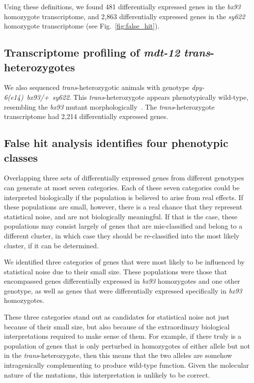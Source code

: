 \documentclass[10pt, twocolumn]{article}
\newcommand{\gene}[1]{\mbox{\emph{#1}}}
\newcommand{\strongn}{2,863}
\newcommand{\weakn}{481}
\newcommand{\transn}{2,214}
\begin{document}
Using these definitions, we found \weakn{} differentially expressed
genes in the  \emph{bx93} homozygote transcriptome, and \strongn{}
differentially expressed genes in the \emph{sy622} homozygote transcriptome
(see Fig.~\ref{fig:false_hit}).

\subsection*{Transcriptome profiling of \gene{mdt-12}
             \emph{trans}-heterozygotes}
We also sequenced \emph{trans}-heterozygotic animals with genotype
\gene{dpy-6(e14) bx93/+ sy622}. This \emph{trans}-heterozygote appears
phenotypically wild-type, resembling the \emph{bx93} mutant
morphologically~\cite{Moghal2003}. The \emph{trans}-heterozygote transcriptome
had \transn{} differentially expressed genes.

\subsection*{False hit analysis identifies four phenotypic classes}
Overlapping three sets of differentially expressed genes from different
genotypes can generate at most seven categories. Each of these seven categories
could be interpreted biologically if the population is believed to arise from
real effects. If these populations are small, however, there is a real chance
that they represent statistical noise, and are not biologically meaningful.
If that is the case, these populations may consist largely of genes that are
mis-classified and belong to a different cluster, in which case they should be
re-classified into the most likely cluster, if it can be determined.

We identified three categories of genes that were most likely to be influenced
by statistical noise due to their small size. These populations were those that
encompassed genes differentially expressed in  \emph{bx93} homozygotes and one
other genotype, as well as genes that were differentially expressed specifically
in \emph{bx93} homozygotes.

These three categories stand out as candidates for statistical noise not just
because of their small size, but also because of the extraordinary biological
interpretations required to make sense of them. For example, if there truly is
a population of genes that is only perturbed in homozygotes of either allele but
not in the \emph{trans}-heterozygote, then this means that the two alleles are
somehow intragenically complementing to produce wild-type function. Given the
molecular nature of the mutations, this interpretation is unlikely to be correct.
\end{document}
